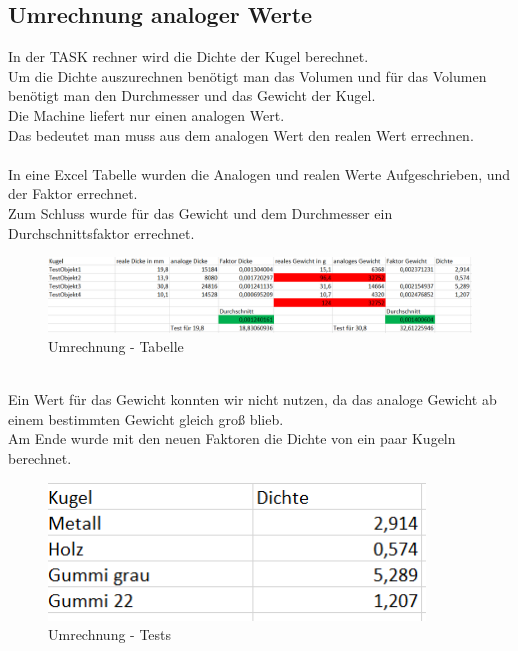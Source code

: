 \subsection{Umrechnung analoger Werte}\label{Umrechnung analoger Werte}
In der TASK rechner wird die Dichte der Kugel berechnet.\\
Um die Dichte auszurechnen benötigt man das Volumen und für das Volumen benötigt man den Durchmesser und das Gewicht der Kugel.\\
Die Machine liefert nur einen analogen Wert.\\
Das bedeutet man muss aus dem analogen Wert den realen Wert errechnen.\\
\\
In eine Excel Tabelle wurden die Analogen und realen Werte Aufgeschrieben, und der Faktor errechnet.\\
Zum Schluss wurde für das Gewicht und dem Durchmesser ein Durchschnittsfaktor errechnet.\\
\begin{figure}[h]
\begin{center}
\includegraphics[width=15cm]{grafiken/UmrechnungsTabelle.png}
\caption{Umrechnung - Tabelle}
\label{Umrechnung}
\end{center}
\end{figure}
\\
Ein Wert für das Gewicht konnten wir nicht nutzen, da das analoge Gewicht ab einem bestimmten Gewicht gleich groß blieb.\\
Am Ende wurde mit den neuen Faktoren die Dichte von ein paar Kugeln berechnet.\\
\begin{figure}[h]
\begin{center}
\includegraphics[width=10cm]{grafiken/UmrechnungTests.png}
\caption{Umrechnung - Tests}
\label{Umrechnung}
\end{center}
\end{figure}
\newpage




